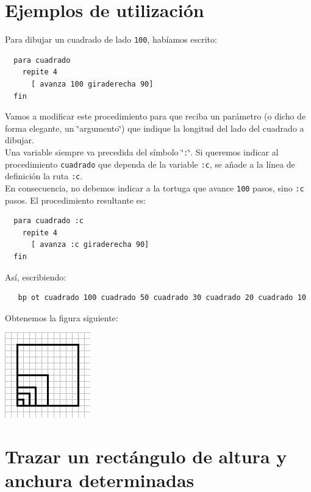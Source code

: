 \documentclass[12pt,twoside,spanish,a4paper]{report}
\begin{document}
\section{Ejemplos de utilizaci\'on}
    \label{sub:Ejemplos-uso-variables}

% 
\noindent Para dibujar un cuadrado de lado \texttt{100}, hab\'iamos escrito:
\begin{verbatim}
  para cuadrado
    repite 4
      [ avanza 100 giraderecha 90]
  fin \end{verbatim}
Vamos a modificar este procedimiento para que reciba un par\'ametro
(o dicho de forma elegante, un \char`\"{}argumento\char`\"{}) que
indique la longitud del lado del cuadrado a dibujar. \\
Una variable siempre va precedida del s\'imbolo \char`\"{}\texttt{:}\char`\"{}.
Si queremos indicar al procedimiento \texttt{cuadrado} que dependa
de la variable \texttt{:c}, se a\~nade a la l\'inea de definici\'on la ruta
\texttt{:c}. \\

En consecuencia, no debemos indicar a la tortuga que avance \texttt{100} pasos,
sino \texttt{:c} pasos. El procedimiento resultante es:
\begin{verbatim}
  para cuadrado :c
    repite 4
      [ avanza :c giraderecha 90]
  fin \end{verbatim}
\noindent As\'i, escribiendo:
\begin{verbatim}
   bp ot cuadrado 100 cuadrado 50 cuadrado 30 cuadrado 20 cuadrado 10  \end{verbatim}
Obtenemos la figura siguiente:
\begin{center}
   \includegraphics[scale=0.5]{Imagenes_Tutorial/07_Cuadrados.png}
\end{center}

\section{Trazar un rect\'angulo de altura y anchura determinadas}
   \label{sub:Trazar-un-rectangulo}
\end{document}
